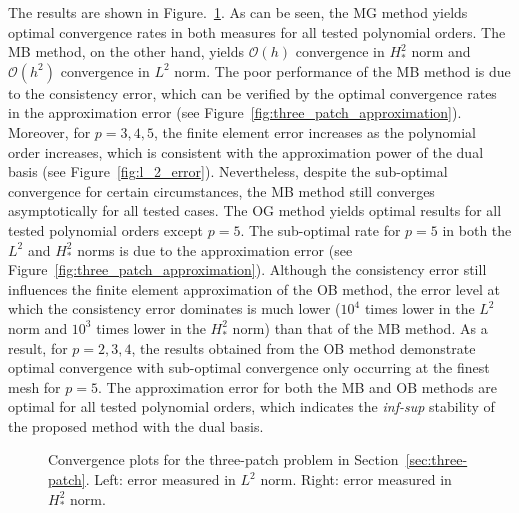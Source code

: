 The results are shown in Figure.~\ref{fig:three_patc_biharmonic_convergence}. As can be seen, the MG method yields optimal convergence rates in both measures for all tested polynomial orders. The MB method, on the other hand, yields $\mathcal{O}(h)$ convergence in $H^2_*$ norm and $\mathcal{O}(h^2)$ convergence in $L^2$ norm. The poor performance of the MB method is due to the consistency error, which can be verified by the optimal convergence rates in the approximation error (see Figure~\ref{fig:three_patch_approximation}). Moreover, for $p=3,4,5$, the finite element error increases as the polynomial order increases, which is consistent with the approximation power of the \Bezier dual basis (see Figure~\ref{fig:l_2_error}). Nevertheless, despite the sub-optimal convergence for certain circumstances, the MB method still converges asymptotically for all tested cases. The OG method yields optimal results for all tested polynomial orders except $p=5$. The sub-optimal rate for $p=5$ in both the $L^2$ and $H^2_*$ norms is due to the approximation error (see Figure~\ref{fig:three_patch_approximation}). Although the consistency error still influences the finite element approximation of the OB method, the error level at which the consistency error dominates is much lower ($10^{4}$ times lower in the $L^2$ norm and $10^{3}$ times lower in the $H^2_*$ norm) than that of the MB method. As a result, for $p=2,3,4$, the results obtained from the OB method demonstrate optimal convergence with sub-optimal convergence only occurring at the finest mesh for $p=5$. The approximation error for both the MB and OB methods are optimal for all tested polynomial orders, which indicates the \textit{inf-sup} stability of the proposed method with the \Bezier dual basis.

\begin{figure}[ht]
	\centering
	\begin{subfigure}[b]{0.47\textwidth}
		
	\end{subfigure}
	\hfill
	\begin{subfigure}[b]{0.47\textwidth}
		
	\end{subfigure}
	\begin{subfigure}[b]{0.47\textwidth}
		
	\end{subfigure}
	\hfill
	\begin{subfigure}[b]{0.47\textwidth}
		
	\end{subfigure}
	\caption{Convergence plots for the three-patch problem in Section~\ref{sec:three-patch}. Left: error measured in $L^2$ norm. Right: error measured in $H^2_*$ norm.}\label{fig:three_patc_biharmonic_convergence}
\end{figure}



